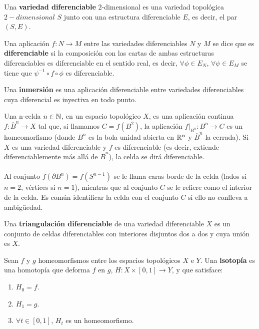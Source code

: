 \begin{definicion} Una \textbf{variedad diferenciable} 2-dimensional es una variedad topológica $2-dimensional$ $S$ junto con una estructura diferenciable $E$, es decir, el par $(S, E)$.
\end{definicion}

\begin{definicion} Una aplicación $f: N \rightarrow M$ entre las variedades diferenciables $N$ y $M$ se dice que es \textbf{diferenciable} si la composición con las cartas de ambas estructuras diferenciables es diferenciable en el sentido real, es decir, $\forall \phi \in E_N$, $\forall \psi \in E_M$ se tiene que $\psi^{-1} \circ f \circ \phi$ es diferenciable.
\end{definicion}

\begin{definicion} Una \textbf{inmersión} es una aplicación diferenciable entre variedades diferenciables cuya diferencial es inyectiva en todo punto.
\end{definicion}

\begin{definicion} Una n-celda $n \in \mathbb{N}$, en un espacio topológico $X$, es una aplicación continua $f: \overline{B}^n \rightarrow X$ tal que, si llamamos $C=f(B^2)$, la aplicación $f|_{B^n}:B^n \rightarrow C$ es un homeomorfismo (donde $B^n$ es la bola unidad abierta en $\mathbb{R}^n$ y $\overline{B}^n$ la cerrada). Si $X$ es una variedad diferenciable y $f$ es diferenciable (es decir, extiende diferenciablemente más allá de $\overline{B}^n$), la celda se dirá diferenciable.\\
\\Al conjunto $f(\partial B^n)=f(S^{n-1})$ se le llama caras borde de la celda (lados si $n=2$, vértices si $n=1$), mientras que al conjunto $C$ se le refiere como el interior de la celda. Es común identificar la celda con el conjunto $C$ si ello no conlleva a ambigüedad.
\end{definicion}

\begin{definicion} Una \textbf{triangulación diferenciable} de una variedad diferenciable $X$ es un conjunto de celdas diferenciables con interiores disjuntos dos a dos y cuya unión es $X$.
\end{definicion}
\newpage
\begin{definicion} Sean $f$ y $g$ homeomorfismos entre los espacios topológicos $X$ e $Y$. Una \textbf{isotopía} es una homotopía que deforma $f$ en $g$, $H: X \times [0,1] \rightarrow Y$, y que satisface:
	\begin{enumerate}
		\item $H_0 = f$.
		\item $H_1 = g$.
		\item $\forall t \in [0,1]$, $H_t$ es un homeomorfismo.
	\end{enumerate}
\end{definicion}


